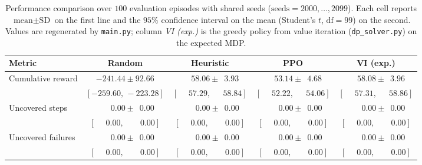 \begin{table}[h]
\centering
\footnotesize
\setlength{\tabcolsep}{3.5pt}
\begin{tabular}{lcccc}
\toprule
Metric & Random & Heuristic & PPO & VI (exp.) \\
\midrule
Cumulative reward    &
    $-241.44 \pm 92.66$                        &
    $\phantom{-}58.06 \pm \phantom{0}3.93$     &
    $\phantom{-}53.14 \pm \phantom{0}4.68$     &
    $\phantom{-}58.08 \pm \phantom{0}3.96$       \\
                                                &
    $[-259.60,\,-223.28]$                      &
    $[\phantom{-0}57.29,\,\phantom{-0}58.84]$  &
    $[\phantom{-0}52.22,\,\phantom{-0}54.06]$  &
    $[\phantom{-0}57.31,\,\phantom{-0}58.86]$    \\
\addlinespace
Uncovered steps      &
    $\phantom{-00}0.00 \pm \phantom{0}0.00$    &
    $\phantom{-00}0.00 \pm \phantom{0}0.00$    &
    $\phantom{-00}0.00 \pm \phantom{0}0.00$    &
    $\phantom{-00}0.00 \pm \phantom{0}0.00$      \\
                                                &
    $[\phantom{-0}0.00,\,\phantom{-00}0.00]$   &
    $[\phantom{-0}0.00,\,\phantom{-00}0.00]$   &
    $[\phantom{-0}0.00,\,\phantom{-00}0.00]$   &
    $[\phantom{-0}0.00,\,\phantom{-00}0.00]$     \\
\addlinespace
Uncovered failures   &
    $\phantom{-00}0.00 \pm \phantom{0}0.00$    &
    $\phantom{-00}0.00 \pm \phantom{0}0.00$    &
    $\phantom{-00}0.00 \pm \phantom{0}0.00$    &
    $\phantom{-00}0.00 \pm \phantom{0}0.00$      \\
                                                &
    $[\phantom{-0}0.00,\,\phantom{-00}0.00]$   &
    $[\phantom{-0}0.00,\,\phantom{-00}0.00]$   &
    $[\phantom{-0}0.00,\,\phantom{-00}0.00]$   &
    $[\phantom{-0}0.00,\,\phantom{-00}0.00]$     \\
\bottomrule
\end{tabular}
\caption{Performance comparison over $100$ evaluation episodes with
         shared seeds ($\text{seeds} = 2000, \ldots, 2099$). Each cell
         reports $\text{mean} \pm \text{SD}$ on the first line and the
         $95\%$ confidence interval on the mean (Student's $t$,
         $\mathrm{df}=99$) on the second. Values are regenerated by
         \texttt{main.py}; column \emph{VI (exp.)} is the greedy policy from
         value iteration (\texttt{dp\_solver.py}) on the expected MDP.}
\label{tab:results}
\end{table}

